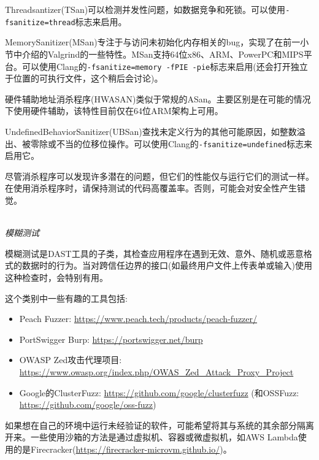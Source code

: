Threadsantizer(TSan)可以检测并发性问题，如数据竞争和死锁。可以使用\texttt{-fsanitize=thread}标志来启用。

MemorySanitizer(MSan)专注于与访问未初始化内存相关的bug，实现了在前一小节中介绍的Valgrind的一些特性。MSan支持64位x86、ARM、PowerPC和MIPS平台。可以使用Clang的\texttt{-fsanitize=memory -fPIE -pie}标志来启用(还会打开独立于位置的可执行文件，这个稍后会讨论)。

硬件辅助地址消杀程序(HWASAN)类似于常规的ASan。主要区别是在可能的情况下使用硬件辅助，该特性目前仅在64位ARM架构上可用。

UndefinedBehaviorSanitizer(UBSan)查找未定义行为的其他可能原因，如整数溢出、被零除或不当的位移位操作。可以使用Clang的\texttt{-fsanitize=undefined}标志来启用它。

尽管消杀程序可以发现许多潜在的问题，但它们的性能仅与运行它们的测试一样。在使用消杀程序时，请保持测试的代码高覆盖率。否则，可能会对安全性产生错觉。

\hspace*{\fill} \\ %
\noindent
\textit{模糊测试}

模糊测试是DAST工具的子类，其检查应用程序在遇到无效、意外、随机或恶意格式的数据时的行为。当对跨信任边界的接口(如最终用户文件上传表单或输入)使用这种检查时，会特别有用。

这个类别中一些有趣的工具包括:

\begin{itemize}
\item 
Peach Fuzzer: \url{https://www.peach.tech/products/peach-fuzzer/}

\item 
PortSwigger Burp: \url{https://portswigger.net/burp}

\item 
OWASP Zed攻击代理项目: \url{https://www.owasp.org/index.php/OWAS\_Zed\_Attack\_Proxy\_Project}

\item 
Google的ClusterFuzz: \url{https://github.com/google/clusterfuzz} (和OSSFuzz: \url{https://github.com/google/oss-fuzz})
\end{itemize}


如果想在自己的环境中运行未经验证的软件，可能希望将其与系统的其余部分隔离开来。一些使用沙箱的方法是通过虚拟机、容器或微虚拟机，如AWS Lambda使用的是Firecracker(\url{https://firecracker-microvm.github.io/})。

